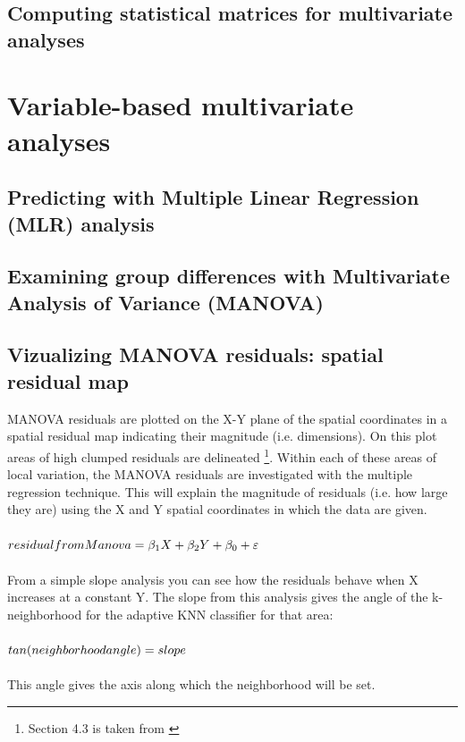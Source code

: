 \documentclass {article}
\begin{document}
\subsection {Computing statistical matrices for multivariate analyses}

 
\section {Variable-based multivariate analyses}

\subsection{Predicting with Multiple Linear Regression (MLR) analysis}

\subsection {Examining group differences with Multivariate Analysis of Variance (MANOVA)}

\subsection {Vizualizing MANOVA residuals: spatial residual map}

MANOVA residuals are plotted on the X-Y plane of the spatial coordinates in a spatial residual map indicating their magnitude (i.e. dimensions). On this plot areas of high clumped residuals are delineated \footnote {Section 4.3 is taken from \cite{tesileanu_geostatistics_2017}}.  
Within each of these areas of local variation, the MANOVA residuals are investigated with the multiple regression technique. This will explain the magnitude of residuals (i.e. how large they are) using the X and Y spatial coordinates in which the data are given.
\\
\\
$residual\underline{\space}from\underline{\space}Manova = \beta_1 X + \beta_2 Y + \beta_0 + \varepsilon$
\\
\\
From a simple slope analysis you can see how the residuals behave when X increases at a constant Y.
 The slope from this analysis gives the angle of the k-neighborhood for the adaptive KNN classifier for that area:
\\
\\
$ tan(neighborhood\underline{\space}angle) = slope $
\\
\\
This angle gives the axis along which the neighborhood will be set.
 
\end{document}
